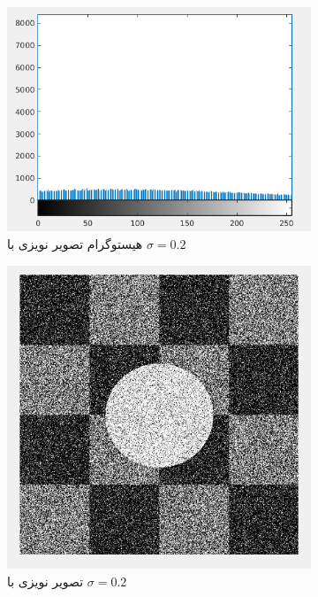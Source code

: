\documentclass[11.5pt,a4paper]{article}
\begin{document}
\begin{figure}[h]
	\begin{subfigure}{.3\textwidth}
		\includegraphics[scale=0.2]{Imgs/NB_S2_Hist.png}
		\caption{هیستوگرام تصویر نویزی با $\sigma=0.2$}
	\end{subfigure}
	\begin{subfigure}{.3\textwidth}
		\includegraphics[scale=0.2]{Imgs/NB_S2_In.png}
		\caption{تصویر نویزی با $\sigma=0.2$}
	\end{subfigure}
	\begin{subfigure}{.3\textwidth}

\end{subfigure}
\end{figure}
\end{document}
